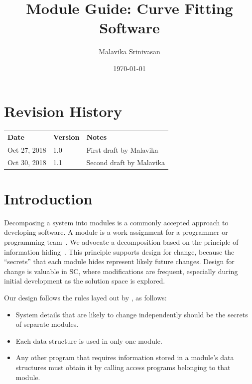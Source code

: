 \documentclass[12pt, titlepage]{article}
\begin{document}
\title{Module Guide: Curve Fitting Software} 
\author{Malavika Srinivasan}
\date{\today}

\maketitle


\section{Revision History}

\begin{tabularx}{\textwidth}{p{3cm}p{2cm}X}
\toprule {\bf Date} & {\bf Version} & {\bf Notes}\\
\midrule
Oct 27, 2018 & 1.0 & First draft by Malavika\\
Oct 30, 2018 & 1.1 & Second draft by Malavika\\
\bottomrule
\end{tabularx}

\newpage

\tableofcontents

\listoftables

\listoffigures

\newpage


\section{Introduction}

Decomposing a system into modules is a commonly accepted approach to developing
software.  A module is a work assignment for a programmer or programming
team~\citep{ParnasEtAl1984}.  We advocate a decomposition
based on the principle of information hiding~\citep{Parnas1972a}.  This
principle supports design for change, because the ``secrets'' that each module
hides represent likely future changes.  Design for change is valuable in SC,
where modifications are frequent, especially during initial development as the
solution space is explored.  

Our design follows the rules layed out by \citet{ParnasEtAl1984}, as follows:
\begin{itemize}
\item System details that are likely to change independently should be the
  secrets of separate modules.
\item Each data structure is used in only one module.
\item Any other program that requires information stored in a module's data
  structures must obtain it by calling access programs belonging to that module.
\end{itemize}
\end{document}
